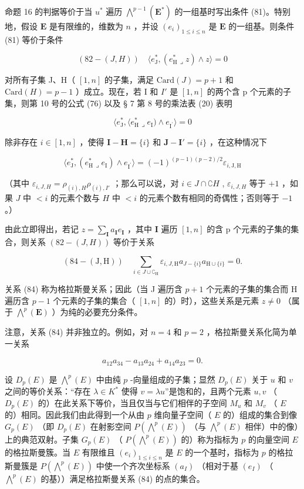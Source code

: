 命题 16 的判据等价于当 \(u^*\) 遍历 \(\bigwedge^{p-1}(\mathbf{E}^*)\) 的一组基时写出条件 (81)。特别地，假设 \(\mathbf{E}\) 是有限维的，维数为 \(n\) ，并设 \((e_i)_{1\leq i\leq n}\) 是 \(\mathbf{E}\) 的一组基。则条件 (81) 等价于条件

\[
(82-(J, H)) \quad \langle e _ {\mathrm{J}} ^ {*}, (e _ {\mathrm{H}} ^ {*} \lrcorner z) \wedge z \rangle = 0
\]

对所有子集 J、H（ \([1, n]\) 的子集，满足 \(\text{Card}(J) = p + 1\) 和 \(\text{Card}(H) = p - 1\) ）成立。现在，若 I 和 \(I'\) 是 \([1, n]\) 的两个含 p 个元素的子集，则第 10 号的公式 (76) 以及 § 7 第 8 号的乘法表 (20) 表明

\[
\langle e _ {\mathrm{J}} ^ {*}, \langle e _ {\mathrm{H}} ^ {*} \lrcorner e _ {\mathrm{I}}) \wedge e _ {\mathrm{I} ^ {\prime}} \rangle = 0
\]

除非存在 \(i \in [1, n]\) ，使得 \(\mathbf{I} - \mathbf{H} = \{i\}\) 和 \(\mathbf{J} - \mathbf{I}' = \{i\}\) ，在这种情况下

\[
\langle e _ {\mathrm{J}} ^ {*}, (e _ {\mathrm{H}} ^ {*} \lrcorner e _ {\mathrm{I}}) \wedge e _ {\mathrm{I} ^ {\prime}} \rangle = (- 1) ^ {(p - 1) (p - 2) / 2} \varepsilon_ {i, \mathrm{J,H}}\tag{83}
\]

（其中 \(\varepsilon_{i,J,H} = \rho_{(i),H}\rho_{(i),I'}\) ；那么可以说，对 \(i\in J\cap \complement H\) , \(\varepsilon_{i,J,H}\) 等于 \(+1\) ，如果 \(J\) 中 \(< i\) 的元素个数与 \(H\) 中 \(< i\) 的元素个数有相同的奇偶性；否则等于 \(-1\) 。）

由此立即得出，若记 \(z = \sum_{\mathbf{I}} a_{\mathbf{I}} e_{\mathbf{I}}\) ，其中 \(\mathbf{I}\) 遍历 \([1, n]\) 的含 p 个元素的子集的集合，则关系 \((82-(J, H))\) 等价于关系

\[
(84 - (\mathrm{J}, \mathrm{H})) \quad \sum_ {i \in J \cup \complement_ {\mathrm{H}}} \varepsilon_ {i, J, \mathrm{H}} a _ {J - \{i \}} a _ {\mathrm{H} \cup \{i \}} = 0.
\]

关系 (84) 称为格拉斯曼关系；因此（当 J 遍历含 \(p + 1\) 个元素的子集的集合而 H 遍历含 \(p - 1\) 个元素的子集的集合（ \([1, n]\) 的）时），这些关系是元素 \(z \neq 0\) （属于 \(\bigwedge^{p}(\mathbf{E})\) ）为纯的必要充分条件。

注意，关系 (84) 并非独立的。例如，对 \(n = 4\) 和 \(p = 2\) ，格拉斯曼关系化简为单一关系

\[
a _ {1 2} a _ {3 4} - a _ {1 3} a _ {2 4} + a _ {1 4} a _ {2 3} = 0.\tag{85}
\]

设 \(D_p(E)\) 是 \(\bigwedge^p(E)\) 中由纯 \(p\) -向量组成的子集；显然 \(D_p(E)\) 关于 \(u\) 和 \(v\) 之间的等价关系：“存在 \(\lambda \in K^*\) 使得 \(v = \lambda u\)”是饱和的，且两个元素 \(u, v\) （ \(D_p(E)\) 的）在此关系下等价，当且仅当与它们相伴的子空间 \(M_u\) 和 \(M_v\) （ \(E\) 的）相同。因此我们由此得到一个从由 \(p\) 维向量子空间（ \(E\) 的）组成的集合到像 \(G_p(E)\) （即 \(D_p(E)\) 在射影空间 \(P(\bigwedge^p(E))\) （与 \(\bigwedge^p(E)\) 相伴）中的像）上的典范双射。子集 \(G_p(E)\) （ \(P(\bigwedge^p(E))\) 的）称为指标为 \(p\) 的向量空间 \(E\) 的格拉斯曼簇。当 \(E\) 有限维且 \((e_i)_{1 \leq i \leq n}\) 是 \(E\) 的一个基时，指标为 \(p\) 的格拉斯曼簇是 \(P(\bigwedge^p(E))\) 中使一个齐次坐标系 \((a_I)\) （相对于基 \((e_I)\) （ \(\bigwedge^p(E)\) 的基））满足格拉斯曼关系 (84) 的点的集合。


